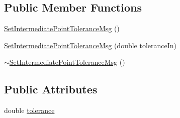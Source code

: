 \subsection*{Public Member Functions}
\begin{DoxyCompactItemize}
\item 
\hyperlink{class_set_intermediate_point_tolerance_msg_acd6039198305dcbbe4ff12a8e53f4fa5}{SetIntermediatePointToleranceMsg} ()
\item 
\hyperlink{class_set_intermediate_point_tolerance_msg_a533f72d020c95c18cd118349f2f1f5da}{SetIntermediatePointToleranceMsg} (double toleranceIn)
\item 
\hyperlink{class_set_intermediate_point_tolerance_msg_a90564396302e031dcae0d5d0ed6dfd08}{$\sim$SetIntermediatePointToleranceMsg} ()
\end{DoxyCompactItemize}
\subsection*{Public Attributes}
\begin{DoxyCompactItemize}
\item 
double \hyperlink{class_set_intermediate_point_tolerance_msg_a27dcb08ae7b05b2cb73f1334b4748c20}{tolerance}
\end{DoxyCompactItemize}



